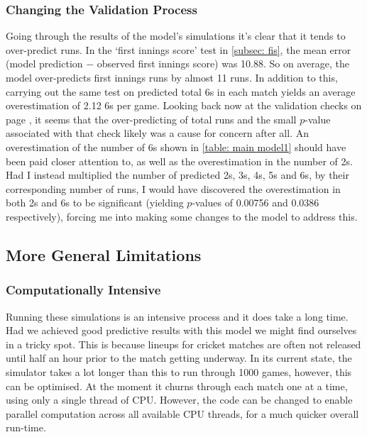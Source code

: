 \subsubsection{Changing the Validation Process}

Going through the results of the model's simulations it's clear that it tends to over-predict runs. In the `first innings score' test in \cref{subsec: fis}, the mean error (model prediction $-$ observed first innings score) was 10.88. So on average, the model over-predicts first innings runs by almost 11 runs. In addition to this, carrying out the same test on predicted total 6s in each match yields an average overestimation of 2.12 6s per game. Looking back now at the validation checks on page \pageref{table: main model1}, it seems that the over-predicting of total runs and the small $p$-value associated with that check likely was a cause for concern after all. An overestimation of the number of 6s shown in \cref{table: main model1} should have been paid closer attention to, as well as the overestimation in the number of 2s. Had I instead multiplied the number of predicted 2s, 3s, 4s, 5s and 6s, by their corresponding number of runs, I would have discovered the overestimation in both 2s and 6s to be significant (yielding $p$-values of 0.00756 and 0.0386 respectively), forcing me into making some changes to the model to address this.

\subsection{More General Limitations}

\subsubsection{Computationally Intensive}

Running these simulations is an intensive process and it does take a long time. Had we achieved good predictive results with this model we might find ourselves in a tricky spot. This is because lineups for cricket matches are often not released until half an hour prior to the match getting underway. In its current state, the simulator takes a lot longer than this to run through 1000 games, however, this can be optimised. At the moment it churns through each match one at a time, using only a single thread of CPU. However, the code can be changed to enable parallel computation across all available CPU threads, for a much quicker overall run-time.


